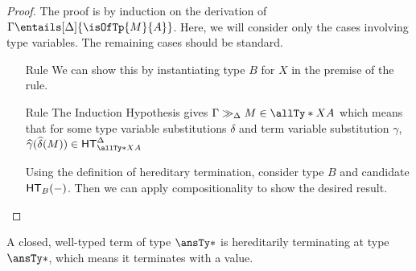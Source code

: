 \documentclass[letterpaper]{article}
\begin{document}
\begin{proof}
    The proof is by induction on the derivation of $\Gamma \entails[\Delta]{\isOfTp{M}{A}}$. Here, we will consider only the cases involving type variables. The remaining cases should be standard.
    \begin{enumerate}
        \item [Rule \ruleref{sta:lam}] We can show this by instantiating type $B$ for $X$ in the premise of the rule.
        
        \item [Rule \ruleref{sta:app}] The Induction Hypothesis gives $\Gamma \gg_\Delta M \in \allTy*{X}{A}$ which means that for some type variable substitutions $\delta$ and term variable substitution $\gamma$, $\widehat{\gamma} (\widehat{\delta}(M)) \in \HT[\allTy*{X}{A}]^\Delta$

        Using the definition of hereditary termination, consider type $B$ and candidate $\HT[B](-)$. Then we can apply compositionality to show the desired result.
    \end{enumerate}
    
\end{proof}

\begin{corollary}
    A closed, well-typed term of type $\ansTy*$ is hereditarily terminating at type $\ansTy*$, which means it terminates with a value.
\end{corollary}
\end{document}
